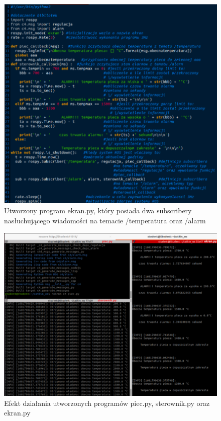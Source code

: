 \documentclass[10pt,a4paper,twoside,twocolumn]{article}%
\begin{document}
\begin{figure}[H]
    \centering
    \includegraphics[width=\linewidth]{6.png}
    \caption{Utworzony program ekran\@.py, który posiada dwa subscribery
    nasłuchującego wiadomości na temacie /temperatura oraz /alarm}
\end{figure}

\begin{figure}[H]
    \centering
    \includegraphics[width=\linewidth]{7.png}
    \caption{Efekt działania utworzonych programów piec\@.py, sterownik\@.py
    oraz ekran\@.py}
\end{figure}
\end{document}
